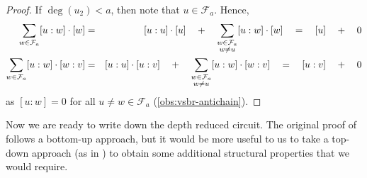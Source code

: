 \begin{proof}
If $\deg(u_2) < a$, then note that $u \in \mathcal{F}_a$. Hence,
\begin{eqnarray*}
\sum_{w\in \mathcal{F}_a} [u:w] \cdot [w] &=& [u:u] \cdot [u] \quad + \quad\sum_{\substack{w\in \mathcal{F}_a\\w\neq u}} [u:w] \cdot [w] \quad = \quad [u] \quad + \quad 0\\
\sum_{w\in \mathcal{F}_a} [u:w] \cdot [w:v] &=& [u:u] \cdot [u:v] \quad + \quad\sum_{\substack{w\in \mathcal{F}_a\\w\neq u}} [u:w] \cdot [w:v] \quad = \quad [u:v] \quad + \quad 0
\end{eqnarray*}
as $[u:w] = 0$ for all $u\neq w \in \mathcal{F}_a$ (\autoref{obs:vsbr-antichain}).
\end{proof}

Now we are ready to write down the depth reduced circuit. The original proof of \cite{vsbr83} follows a bottom-up approach, but it would be more useful to us to take a top-down approach (as in \cite{ajmv98}) to obtain some additional structural properties that we would require. \\

